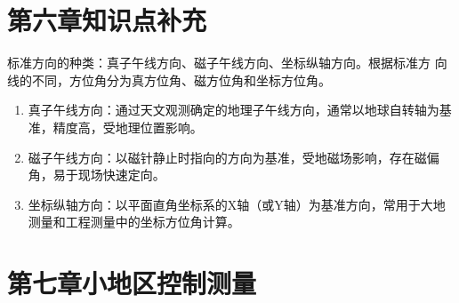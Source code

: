 \documentclass[12pt,a4paper]{article}
\begin{document}
\section*{第六章\quad 知识点补充}

标准方向的种类：真子午线方向、磁子午线方向、坐标纵轴方向。根据标准方
向线的不同，方位角分为真方位角、磁方位角和坐标方位角。 

\begin{enumerate}
    \item 真子午线方向：通过天文观测确定的地理子午线方向，通常以地球自转轴为基准，精度高，受地理位置影响。
    \item 磁子午线方向：以磁针静止时指向的方向为基准，受地磁场影响，存在磁偏角，易于现场快速定向。
    \item 坐标纵轴方向：以平面直角坐标系的X轴（或Y轴）为基准方向，常用于大地测量和工程测量中的坐标方位角计算。
\end{enumerate}

\newpage

\section*{第七章\quad 小地区控制测量}
\end{document}
